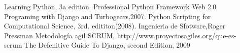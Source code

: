 \begin{thebibliography}{2007}
Learning Python, 3a edition.
Professional Python Framework Web 2.0 Programing with Django and Turbogears,2007.
Python Scripting for Computational Science, 3rd. edititon(2008). 
Ingenieria de Sfotware,Roger Pressman
Metodología agil SCRUM, http://www.proyectosagiles.org/que-es-scrum
The Defenitive Guide To Django, second Edition, 2009
\end{thebibliography}